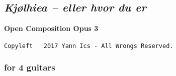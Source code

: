 \chapter*{}



\thispagestyle{empty}

\section*{\textsl{Kj{\o}lhiea -- eller hvor du er}}
\label{kjcccc}

\begin{center} 
\textbf{Open Composition Opus 3}

{\scriptsize  \texttt{Copyleft \textcopyleft \, 2017 Yann Ics - All Wrongs Reserved.}}
 \end{center} 
 
\subsection*{\quad for 4 guitars}
\label{kjccqg}
\label{kj}

\vspace{-5mm}

